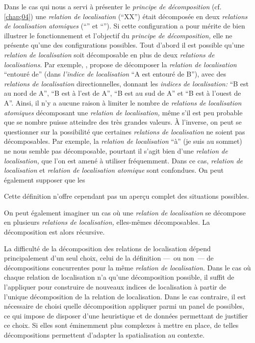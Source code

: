 Dans le cas qui nous a servi à présenter le \emph{principe de
  décomposition} (cf. \autoref{chap;04}) une \emph{relation de
  localisation} (\enquote{XX}) était décomposée en deux
\emph{relations de localisation atomiques} (\enquote{} et
\enquote{}). Si cette configuration a pour mérite de bien illustrer le
fonctionnement et l'objectif du \emph{principe de décomposition,} elle
ne présente qu'une des configurations possibles. Tout d'abord il est
possible qu'une \emph{relation de localisation} soit décomposable en
plus de deux \emph{relations de localisations.} Par exemple,
\textcite{Vanegas2011}, propose de décomposer la \emph{relation de
  localisation} \enquote{entouré de} (dans \emph{l'indice de
  localisation} \enquote{A est entouré de B}), avec des
\emph{relations de localisation} directionnelles, donnant les
\emph{indices de localisation:} \enquote{B est au nord de A},
\enquote{B est à l'est de A}, \enquote{B est au sud de A} et
\enquote{B est à l'ouest de A}. Ainsi, il n'y a aucune raison à
limiter le nombre de \emph{relations de localisation atomiques}
décomposant une \emph{relation de localisation,} même s'il est peu
probable que se nombre puisse atteindre des très grandes valeurs. À
l'inverse, on peut se questionner sur la possibilité que certaines
\emph{relations de localisation} ne soient pas décomposables. Par
exemple, la \emph{relation de localisation} \enquote{à} (\eg je suis
au sommet) ne nous semble pas décomposable, pourtant il s'agit bien
d'une \emph{relation de localisation,} que l'on est amené à utiliser
fréquemment. Dans ce cas, \emph{relation de localisation} et
\emph{relation de localisation atomique} sont confondues. On peut
également supposer que les 

Cette définition n'offre cependant pas un aperçu complet des
situations possibles.

On peut également imaginer un cas où une \emph{relation de
  localisation} se décompose en plusieurs \emph{relations de
  localisation,} elles-mêmes décomposables. La décomposition est alors
récursive.



La difficulté de la décomposition des relations de localisation dépend
principalement d'un seul choix, celui de la définition ---~ou non~---
de décompositions concurrentes pour la même \emph{relation de
  localisation.} Dans le cas où chaque relation de localisation n'a
qu'une décomposition possible, il suffit de l'appliquer pour
construire de nouveaux indices de localisation à partir de l'unique
décomposition de la relation de localisation. Dans le cas contraire,
il est nécessaire de choisi quelle décomposition appliquer parmi un
panel de possibles, ce qui impose de disposer d'une heuristique et de
données permettant de justifier ce choix. Si elles sont éminemment
plus complexes à mettre en place, de telles décompositions permettent
d’adapter la spatialisation au contexte.




